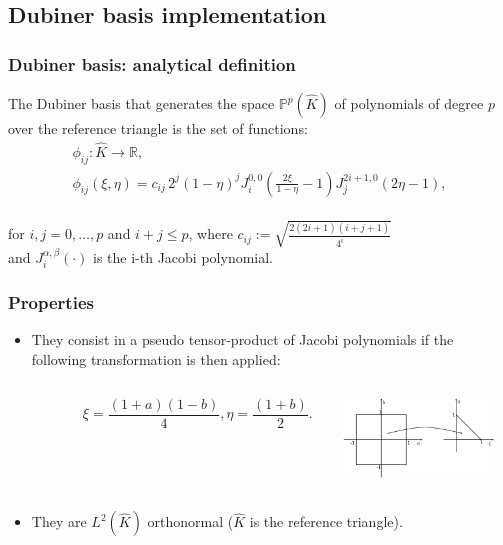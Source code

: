 \documentclass[9pt]{beamer}
\begin{document}
\begin{frame}
\section{Dubiner basis implementation}
\frametitle{Dubiner basis: analytical definition}
\begin{definition} \label{dubiner}
	The Dubiner basis that generates the space $\mathbb{P}^p(\hat{K})$ of polynomials of degree $p$ over the reference triangle is the set of functions:
	\begin{equation*}
	\begin{gathered}
	 \phi_{ij}: \hat{K} \rightarrow \mathbb{R}, \\
	\phi_{ij}(\xi,\eta) =c_{ij} \, 2^j (1-\eta)^j J_i^{0,0}(\frac{2\xi}{1-\eta}-1) J_j^{2i+1,0} (2\eta-1),
	\end{gathered}
	\end{equation*}
	\vspace{2mm} \\
	\center
	for $i,j=0,\dots,p$ and $i+j \le p$, where $c_{ij} := \sqrt{\frac{2(2i+1)(i+j+1)}{4^i}}$ \\
	and $J_i^{\alpha,\beta}(\cdot)$ is the i-th Jacobi polynomial.
\end{definition}
\end{frame}

\begin{frame}
\frametitle{Properties}
\begin{itemize}
	\item They consist in a pseudo tensor-product of Jacobi polynomials if the following transformation is then applied:
	\begin{columns}
		\begin{column}{0.5\textwidth}
			\begin{equation*}\label{transformation_formula}
			\quad \quad \quad \xi=\frac{(1+a)(1-b)}{4},  \eta=\frac{(1+b)}{2}.
			\end{equation*}
		\end{column}
		\begin{column}{0.5\textwidth}  
			\includegraphics[width = 4cm]{./transformation.png}
		\end{column}
	\end{columns}
    \item They are $L^2(\hat{K})$ orthonormal ($\hat{K}$ is the reference triangle).
\end{itemize}
\end{frame}
\end{document}
